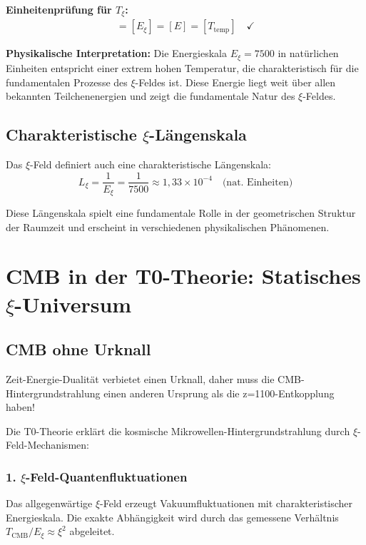 	\textbf{Einheitenprüfung für $T_\xi$:}
	\begin{align}
		[T_\xi] = [E_\xi] = [E] = [T_{\text{temp}}] \quad \checkmark
	\end{align}
	
	\textbf{Physikalische Interpretation:} Die Energieskala $E_\xi = 7500$ in natürlichen Einheiten entspricht einer extrem hohen Temperatur, die charakteristisch für die fundamentalen Prozesse des $\xi$-Feldes ist. Diese Energie liegt weit über allen bekannten Teilchenenergien und zeigt die fundamentale Natur des $\xi$-Feldes.
	
	\subsection{Charakteristische $\xi$-Längenskala}
	
	Das $\xi$-Feld definiert auch eine charakteristische Längenskala:
	\begin{equation}
		L_\xi = \frac{1}{E_\xi} = \frac{1}{7500} \approx 1,33 \times 10^{-4} \quad \text{(nat. Einheiten)}
	\end{equation}
	
	Diese Längenskala spielt eine fundamentale Rolle in der geometrischen Struktur der Raumzeit und erscheint in verschiedenen physikalischen Phänomenen.
	
	\section{CMB in der T0-Theorie: Statisches $\xi$-Universum}
	
	\subsection{CMB ohne Urknall}
	
	\begin{revolutionary}
		Zeit-Energie-Dualität verbietet einen Urknall, daher muss die CMB-Hintergrundstrahlung einen anderen Ursprung als die z=1100-Entkopplung haben!
	\end{revolutionary}
	
	Die T0-Theorie erklärt die kosmische Mikrowellen-Hintergrundstrahlung durch $\xi$-Feld-Mechanismen:
	
	\subsubsection{1. $\xi$-Feld-Quantenfluktuationen}
	Das allgegenwärtige $\xi$-Feld erzeugt Vakuumfluktuationen mit charakteristischer Energieskala. Die exakte Abhängigkeit wird durch das gemessene Verhältnis $T_{\text{CMB}}/E_\xi \approx \xi^2$ abgeleitet.
	
